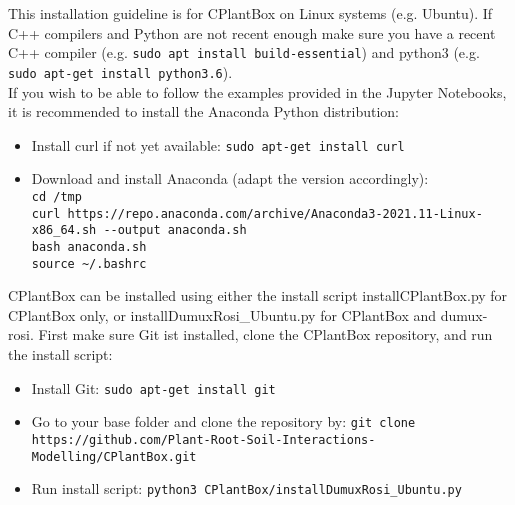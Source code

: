 This installation guideline is for CPlantBox on Linux systems (e.g. Ubuntu). If C++ compilers and Python are not recent enough make sure you have a recent C++ compiler (e.g. \lstinline{sudo apt install build-essential}) and python3 (e.g. \lstinline{sudo apt-get install python3.6}). \\

If you wish to be able to follow the examples provided in the Jupyter Notebooks, it is recommended to install the Anaconda Python distribution: 
\begin{itemize}
\item Install curl if not yet available: \lstinline{sudo apt-get install curl}
\item Download and install Anaconda (adapt the version accordingly):\\
\lstinline{cd /tmp}\\
\lstinline{curl https://repo.anaconda.com/archive/Anaconda3-2021.11-Linux-x86_64.sh --output anaconda.sh} \\
\lstinline{bash anaconda.sh} \\
\lstinline{source ~/.bashrc}
\end{itemize}

CPlantBox can be installed using either the install script installCPlantBox.py for CPlantBox only, or installDumuxRosi\_Ubuntu.py for CPlantBox and dumux-rosi. First make sure Git ist installed, clone the CPlantBox repository, and run the install script:
\begin{itemize}
 \item Install Git: \lstinline{sudo apt-get install git}
 \item Go to your base folder and clone the repository by: \lstinline{git clone https://github.com/Plant-Root-Soil-Interactions-Modelling/CPlantBox.git}
 \item Run install script: \lstinline{python3 CPlantBox/installDumuxRosi_Ubuntu.py}  
\end{itemize}

